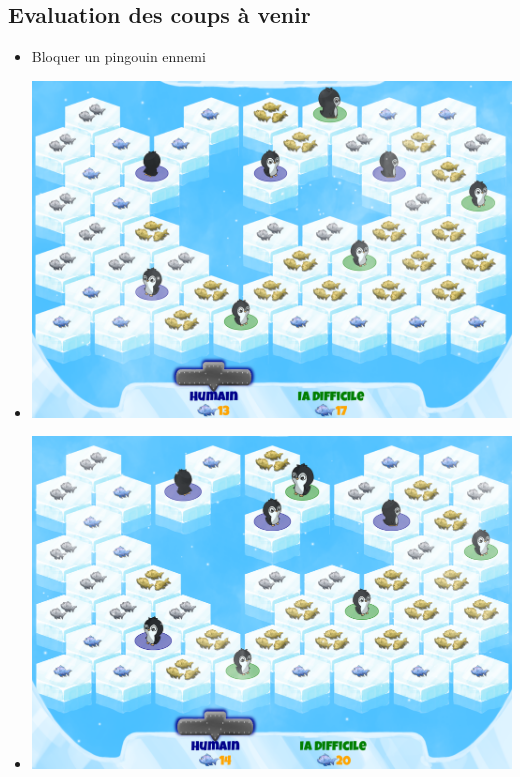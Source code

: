 \documentclass{beamer}
\begin{document}
\subsection{Evaluation des coups à venir}
\begin{frame}{}
\begin{block}{}
\begin{itemize}
 \item<1-> Bloquer un pingouin ennemi
 \item<2-> \includegraphics[scale=0.1]{IA5}
 \item<3-> \includegraphics[scale=0.1]{IA6}
\end{itemize}
\end{block}
\end{frame}
\end{document}
